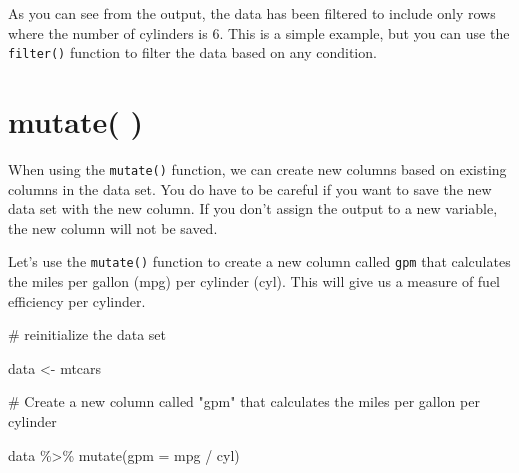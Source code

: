 \documentclass[
  letterpaper,
  DIV=11,
  numbers=noendperiod]{scrreprt}
\newenvironment{Shaded}{\begin{snugshade}}{\end{snugshade}}
\newcommand{\AttributeTok}[1]{\textcolor[rgb]{0.40,0.45,0.13}{#1}}
\newcommand{\CommentTok}[1]{\textcolor[rgb]{0.37,0.37,0.37}{#1}}
\newcommand{\FunctionTok}[1]{\textcolor[rgb]{0.28,0.35,0.67}{#1}}
\newcommand{\NormalTok}[1]{\textcolor[rgb]{0.00,0.23,0.31}{#1}}
\newcommand{\OtherTok}[1]{\textcolor[rgb]{0.00,0.23,0.31}{#1}}
\newcommand{\SpecialCharTok}[1]{\textcolor[rgb]{0.37,0.37,0.37}{#1}}
\begin{document}
As you can see from the output, the data has been filtered to include
only rows where the number of cylinders is 6. This is a simple example,
but you can use the \texttt{filter()} function to filter the data based
on any condition.

\section*{mutate( )}\label{mutate}


When using the \texttt{mutate()} function, we can create new columns
based on existing columns in the data set. You do have to be careful if
you want to save the new data set with the new column. If you don't
assign the output to a new variable, the new column will not be saved.

Let's use the \texttt{mutate()} function to create a new column called
\texttt{gpm} that calculates the miles per gallon (mpg) per cylinder
(cyl). This will give us a measure of fuel efficiency per cylinder.

\begin{Shaded}
\begin{Highlighting}[]
\CommentTok{\# reinitialize the data set}

\NormalTok{data }\OtherTok{\textless{}{-}}\NormalTok{ mtcars}

\CommentTok{\# Create a new column called "gpm" that calculates the miles per gallon per cylinder}

\NormalTok{data }\SpecialCharTok{\%\textgreater{}\%}
  \FunctionTok{mutate}\NormalTok{(}\AttributeTok{gpm =}\NormalTok{ mpg }\SpecialCharTok{/}\NormalTok{ cyl)}
\end{Highlighting}
\end{Shaded}
\end{document}
